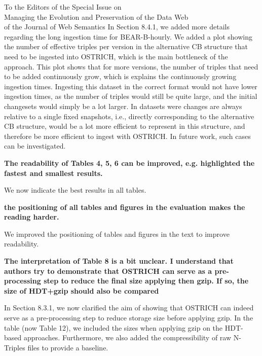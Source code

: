 \documentclass{letter}
\begin{document}
\begin{letter}{To the Editors of the Special Issue on\\Managing the Evolution and Preservation of the Data Web\\of the Journal of Web Semantics}
In Section 8.4.1, we added more details regarding the long ingestion time for BEAR-B-hourly.
We added a plot showing the number of effective triples per version in the alternative CB structure that need to be ingested into OSTRICH,
which is the main bottleneck of the approach.
This plot shows that for more versions, the number of triples that need to be added continuously grow,
which is explains the continuously growing ingestion times.
Ingesting this dataset in the correct format would not have lower ingestion times,
as the number of triples would still be quite large, and the initial changesets would simply be a lot larger.
In datasets were changes are always relative to a single fixed snapshots, i.e., directly corresponding to the alternative CB structure,
would be a lot more efficient to represent in this structure, and therefore be more efficient to ingest with OSTRICH.
In future work, such cases can be investigated.

\textbf{The readability of Tables 4, 5, 6 can be improved, e.g. highlighted the fastest and smallest results.}

We now indicate the best results in all tables.

\textbf{the positioning of all tables and figures in the evaluation makes the reading harder.}

We improved the positioning of tables and figures in the text to improve readability.

\textbf{The interpretation of Table 8 is a bit unclear. I understand that authors try to demonstrate that OSTRICH can serve as a pre-processing step to reduce the final size applying then gzip. If so, the size of HDT+gzip should also be compared}

In Section 8.3.1, we now clarified the aim of showing that OSTRICH can indeed serve as a pre-processing step to reduce storage size before applying gzip.
In the table (now Table 12), we included the sizes when applying gzip on the HDT-based approaches.
Furthermore, we also added the compressibility of raw N-Triples files to provide a baseline.

\end{letter}
\end{document}
